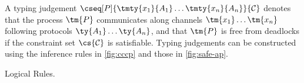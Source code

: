 \begin{definition}\label{def:ap-typing}
  A typing judgement
  $\cseq[P]{\tmty{x_1}{A_1}\dots\tmty{x_n}{A_n}}{\mathcal{C}}$ denotes that the
  process $\tm{P}$ communicates along channels $\tm{x_1}\dots\tm{x_n}$ following
  protocols $\ty{A_1}\dots\ty{A_n}$, and that $\tm{P}$ is free from deadlocks if
  the constraint set $\cs{\mathcal{C}}$ is satisfiable.
  Typing judgements can be constructed using the inference rules in
  \cref{fig:cccp} and those in \cref{fig:safe-ap}.
\end{definition}
\begin{figure*}[!htb]
  Logical Rules.
  \begin{center} \apInfApBang  \apInfApYnot  \end{center}\vspace*{1\baselineskip}
  \begin{center} \apInfApBangC               \end{center}\vspace*{1\baselineskip}
  \begin{center} \apInfApYnotC               \end{center}\vspace*{1\baselineskip}
  \begin{center} \apInfApBangW \apInfApYnotW \end{center}
  
  \caption{Safe Access Points}
  \label{fig:safe-ap}
\end{figure*}
